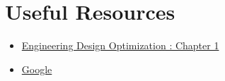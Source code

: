 \documentclass[12pt]{article}
\begin{document}
	\bigskip
	

	
	
	\section{Useful Resources}
	\begin{multicols}{2}
	\begin{itemize}
    		\item \href{http://flowlab.groups.et.byu.net/mdobook.pdf}{Engineering Design Optimization : Chapter 1}
    		\item \href{https://www.google.com/}{Google}
	\end{itemize}
	\end{multicols}
	
	
	
	
	
	
\end{document}
